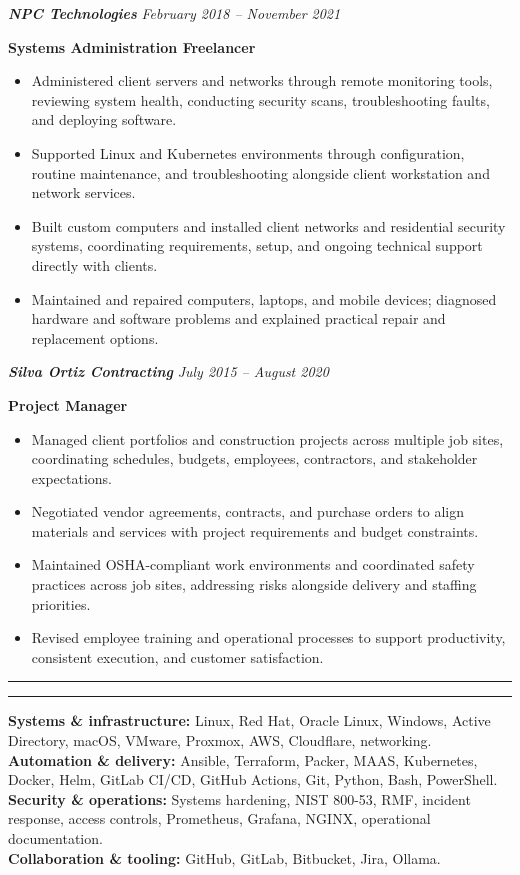 \documentclass[10.5pt, letterpaper]{article}
\newcommand{\ressection}[1]{%
  \vspace{6pt}%
  \noindent\rule{\linewidth}{0.5pt}%
  \par\noindent\makebox[\linewidth][c]{\textbf{#1}}%
  \par\vspace{-8pt}%
  \noindent\rule{\linewidth}{0.5pt}%
}
\begin{document}
\vspace{10pt}
\textbf{\textit{NPC Technologies}} \hfill \textit{February 2018 -- November 2021}

\vspace{1pt}
\textbf{Systems Administration Freelancer}
\begin{itemize}
  \item Administered client servers and networks through remote monitoring tools, reviewing system health, conducting security scans, troubleshooting faults, and deploying software.
  \item Supported Linux and Kubernetes environments through configuration, routine maintenance, and troubleshooting alongside client workstation and network services.
  \item Built custom computers and installed client networks and residential security systems, coordinating requirements, setup, and ongoing technical support directly with clients.
  \item Maintained and repaired computers, laptops, and mobile devices; diagnosed hardware and software problems and explained practical repair and replacement options.
\end{itemize}

\vspace{10pt}
\textbf{\textit{Silva Ortiz Contracting}} \hfill \textit{July 2015 -- August 2020}

\vspace{1pt}
\textbf{Project Manager}
\begin{itemize}
  \item Managed client portfolios and construction projects across multiple job sites, coordinating schedules, budgets, employees, contractors, and stakeholder expectations.
  \item Negotiated vendor agreements, contracts, and purchase orders to align materials and services with project requirements and budget constraints.
  \item Maintained OSHA-compliant work environments and coordinated safety practices across job sites, addressing risks alongside delivery and staffing priorities.
  \item Revised employee training and operational processes to support productivity, consistent execution, and customer satisfaction.
\end{itemize}

\pagebreak
\ressection{TECHNICAL SKILLS}

{\small \textbf{Systems \& infrastructure:} Linux, Red Hat, Oracle Linux, Windows, Active Directory, macOS, VMware, Proxmox, AWS, Cloudflare, networking.\\
\textbf{Automation \& delivery:} Ansible, Terraform, Packer, MAAS, Kubernetes, Docker, Helm, GitLab CI/CD, GitHub Actions, Git, Python, Bash, PowerShell.\\
\textbf{Security \& operations:} Systems hardening, NIST 800-53, RMF, incident response, access controls, Prometheus, Grafana, NGINX, operational documentation.\\
\textbf{Collaboration \& tooling:} GitHub, GitLab, Bitbucket, Jira, Ollama.}
\end{document}
